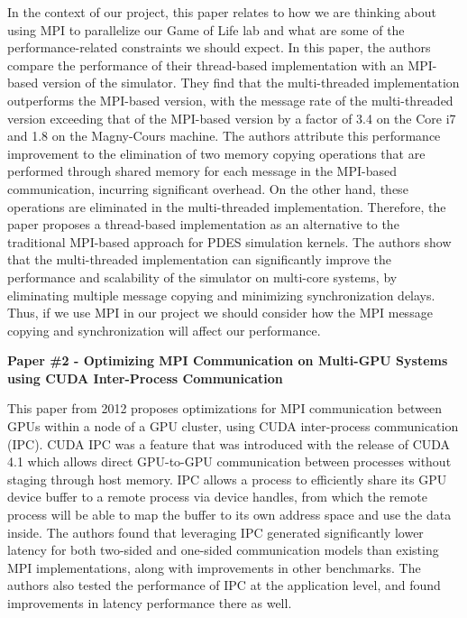 \documentclass[11pt]{article}
\begin{document}
In the context of our project, this paper relates to how we are thinking about using MPI to parallelize our Game of Life lab and what are some of the performance-related constraints we should expect. In this paper, the authors compare the performance of their thread-based implementation with an MPI-based version of the simulator. They find that the multi-threaded implementation outperforms the MPI-based version, with the message rate of the multi-threaded version exceeding that of the MPI-based version by a factor of 3.4 on the Core i7 and 1.8 on the Magny-Cours machine. The authors attribute this performance improvement to the elimination of two memory copying operations that are performed through shared memory for each message in the MPI-based communication, incurring significant overhead. On the other hand, these operations are eliminated in the multi-threaded implementation. Therefore, the paper proposes a thread-based implementation as an alternative to the traditional MPI-based approach for PDES simulation kernels. The authors show that the multi-threaded implementation can significantly improve the performance and scalability of the simulator on multi-core systems, by eliminating multiple message copying and minimizing synchronization delays. Thus, if we use MPI in our project we should consider how the MPI message copying and synchronization will affect our performance.

\vspace{1em}

\noindent \textbf{Paper \#2 - Optimizing MPI Communication on Multi-GPU Systems using CUDA Inter-Process Communication}

This paper from 2012 proposes optimizations for MPI communication between GPUs within a node of a GPU cluster, using CUDA inter-process communication (IPC). CUDA IPC was a feature that was introduced with the release of CUDA 4.1 which allows direct GPU-to-GPU communication between processes without staging through host memory. IPC allows a process to efficiently share its GPU device buffer to a remote process via device handles, from which the remote process will be able to map the buffer to its own address space and use the data inside. The authors found that leveraging IPC generated significantly lower latency for both two-sided and one-sided communication models than existing MPI implementations, along with improvements in other benchmarks. The authors also tested the performance of IPC at the application level, and found improvements in latency performance there as well. 
\end{document}
